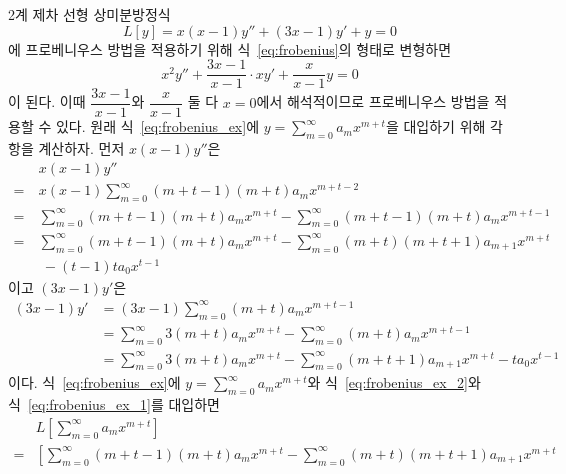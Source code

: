 \documentclass[../engineering_mathematics_lecture_note.tex]{subfiles}
\begin{document}
\begin{example}
    2계 제차 선형 상미분방정식
    \begin{equation} \label{eq:frobenius_ex}
        L[y] = x(x - 1)y'' + (3x - 1) y' + y = 0
    \end{equation}
    에 프로베니우스 방법을 적용하기 위해 식~\ref{eq:frobenius}의 형태로 변형하면
    \begin{equation*}
        x^2 y'' + \frac{3x - 1}{x - 1} \cdot x y' + \frac{x}{x - 1} y = 0
    \end{equation*}
    이 된다.
    이때 $\dfrac{3x - 1}{x - 1}$와 $\dfrac{x}{x - 1}$ 둘 다 $x = 0$에서 해석적이므로 프로베니우스 방법을 적용할 수 있다.
    원래 식~\ref{eq:frobenius_ex}에 $y = \sum^{\infty}_{m = 0} a_m x^{m + t}$을 대입하기 위해 각 항을 계산하자.
    먼저 $x(x - 1)y''$은
    \begin{align}
        & x(x - 1)y''\nonumber\\
        =\ & x(x - 1) \sum^{\infty}_{m = 0} (m + t - 1)(m + t) a_m x^{m + t - 2}\nonumber\\
                    =\ & \sum^{\infty}_{m = 0} (m + t - 1)(m + t) a_m x^{m + t} - \sum^{\infty}_{m = 0} (m + t - 1)(m + t) a_m x^{m + t - 1}\nonumber\\
                    =\ & \sum^{\infty}_{m = 0} (m + t - 1)(m + t) a_m x^{m + t}- \sum^{\infty}_{m = 0} (m + t)(m + t + 1) a_{m + 1} x^{m + t}\nonumber\\
                       &\ - (t - 1)t a_0 x^{t - 1} \label{eq:frobenius_ex_2}
    \end{align}
    이고 $(3x - 1)y'$은
    \begin{align}
        (3x - 1)y' &= (3x - 1) \sum^{\infty}_{m = 0} (m + t) a_m x^{m + t - 1}\nonumber\\
                   &= \sum^{\infty}_{m = 0} 3 (m + t) a_m x^{m + t} - \sum^{\infty}_{m = 0} (m + t) a_m x^{m + t - 1}\nonumber\\
                   &= \sum^{\infty}_{m = 0} 3 (m + t) a_m x^{m + t} - \sum^{\infty}_{m = 0} (m + t + 1) a_{m + 1} x^{m + t} - t a_0 x^{t - 1} \label{eq:frobenius_ex_1}
    \end{align}
    이다.
    식~\ref{eq:frobenius_ex}에 $y = \sum^{\infty}_{m = 0} a_m x^{m + t}$와 식~\ref{eq:frobenius_ex_2}와 식~\ref{eq:frobenius_ex_1}를 대입하면
    \begin{align*}
        & L \left[ \sum^{\infty}_{m = 0} a_m x^{m + t} \right]\\
        =& \left[\sum^{\infty}_{m = 0} (m + t - 1)(m + t) a_m x^{m + t}- \sum^{\infty}_{m = 0} (m + t)(m + t + 1) a_{m + 1} x^{m + t}\right.\\

\end{align*}
\end{example}
\end{document}
